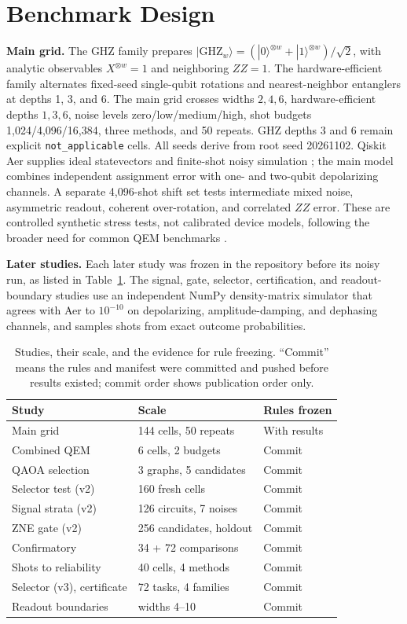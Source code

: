 \documentclass[10pt,twocolumn]{article}
\newcommand{\paragraphlead}[1]{\textbf{#1}\quad}
\begin{document}
\section{Benchmark Design}
\label{sec:design}
\paragraphlead{Main grid.}
The GHZ family prepares $|\mathrm{GHZ}_w\rangle=(|0\rangle^{\otimes w}+|1\rangle^{\otimes w})/\sqrt2$,
with analytic observables $X^{\otimes w}=1$ and neighboring $ZZ=1$. The hardware-efficient family
alternates fixed-seed single-qubit rotations and nearest-neighbor entanglers at depths 1, 3, and 6.
The main grid crosses widths $2,4,6$, hardware-efficient depths $1,3,6$, noise levels
zero/low/medium/high, shot budgets 1,024/4,096/16,384, three methods, and 50 repeats.
GHZ depths 3 and 6 remain explicit \texttt{not\_applicable} cells. All seeds derive from root seed
20261102. Qiskit Aer supplies ideal statevectors and finite-shot noisy simulation \cite{qiskitaer};
the main model combines independent assignment error with one- and two-qubit depolarizing
channels. A separate 4,096-shot shift set tests intermediate mixed noise, asymmetric readout,
coherent over-rotation, and correlated $ZZ$ error. These are controlled synthetic stress tests, not
calibrated device models, following the broader need for common QEM benchmarks \cite{bultrini2021}.

\paragraphlead{Later studies.}
Each later study was frozen in the repository before its noisy run, as listed in
Table~\ref{tab:studies}. The signal, gate, selector, certification, and readout-boundary studies use
an independent NumPy density-matrix simulator that agrees with Aer to $10^{-10}$ on depolarizing,
amplitude-damping, and dephasing channels, and samples shots from exact outcome probabilities.

\begin{table}[t]
\centering
\caption{Studies, their scale, and the evidence for rule freezing. ``Commit'' means the rules and
manifest were committed and pushed before results existed; commit order shows publication order
only.}
\label{tab:studies}
\footnotesize
\setlength{\tabcolsep}{3pt}
\begin{tabular}{@{}lll@{}}
\toprule
Study & Scale & Rules frozen\\
\midrule
Main grid & 144 cells, 50 repeats & With results\\
Combined QEM & 6 cells, 2 budgets & Commit\\
QAOA selection & 3 graphs, 5 candidates & Commit\\
Selector test (v2) & 160 fresh cells & Commit\\
Signal strata (v2) & 126 circuits, 7 noises & Commit\\
ZNE gate (v2) & 256 candidates, holdout & Commit\\
Confirmatory & 34 + 72 comparisons & Commit\\
Shots to reliability & 40 cells, 4 methods & Commit\\
Selector (v3), certificate & 72 tasks, 4 families & Commit\\
Readout boundaries & widths 4--10 & Commit\\
\bottomrule
\end{tabular}
\end{table}
\end{document}
